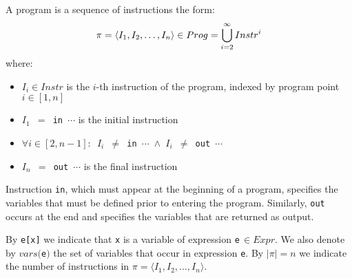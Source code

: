 


\begin{definition}[Program]
\label{de:program}
A program is a sequence of instructions the form:
\vspace{-3mm}
\begin{equation*}
\pi=\langle I_1, I_2, \ldots, I_n \rangle\in Prog = \bigcup_{i=2}^{\infty} Instr^{i}
\vspace{-4mm}
\end{equation*}
where: 

\begin{itemize}[itemsep=3pt,parsep=0pt,topsep=3pt]
\item \texttt{$I_i\in Instr$} is the $i$-th instruction of the program, indexed by program point \texttt{$i\in[1,n]$}
\item \texttt{$I_1$ $=$ in $\cdots$} is the initial instruction
\item \texttt{$\forall i\in[2,n-1]:$ $I_i$ $\neq$ in $\cdots$ $\wedge$ $I_i$ $\neq$ out $\cdots$}
\item \texttt{$I_n$ $=$ out $\cdots$} is the final instruction
\end{itemize}
\end{definition}

\noindent Instruction \texttt{in}, which must appear at the beginning of a program, specifies the variables that must be defined prior to entering the program. Similarly, \texttt{out} occurs at the end and specifies the variables that are returned as output. 

\noindent By \texttt{e[x]} we indicate that \texttt{x} is a variable of expression \texttt{e}\,$\in Expr$. We also denote by $vars($\texttt{e}$)$ the set of variables that occur in expression \texttt{e}. By $|\pi|=n$ we indicate the number of instructions in $\pi=\langle I_1, I_2, \ldots, I_n \rangle$.

